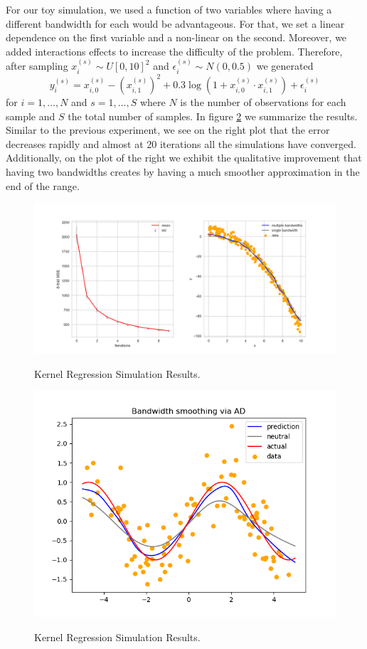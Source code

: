 \documentclass{article}
\begin{document}
For our toy simulation, we used a function of two variables where having a different
bandwidth for each would be advantageous. For that, we set a linear dependence on the first
variable and a non-linear on the second. Moreover, we added interactions effects to increase
the difficulty of the problem. Therefore, after sampling $x_i^{(s)} \sim U[0, 10]^2$ and
$\epsilon_i^{(s)} \sim N(0,0.5)$ we generated
$$
y_i^{(s)} =
x_{i,0}^{(s)} - \left( x_{i,1}^{(s)} \right)^{2} + 0.3 \log \left(1 + x_{i,0}^{(s)} \cdot
x_{i,1}^{(s)} \right) + \epsilon_i^{(s)}
$$
for $i=1, \dots, N$ and $s=1, \dots, S$ where $N$ is the number of observations for each
sample and $S$ the total number of samples. In figure \ref{krr} we summarize the results.
Similar to the previous experiment, we see on the right plot that the error decreases
rapidly and almost at 20 iterations all the simulations have converged. Additionally, on the
plot of the right we exhibit the qualitative improvement that having two bandwidths creates
by having a much smoother approximation in the end of the range.

\begin{figure}
  \centering
  \caption{Kernel Regression Simulation Results.}
  \includegraphics[width=\textwidth]{./pics/ker_reg_results.png}
  \label{krr}
\end{figure}

\begin{figure}
  \centering
  \caption{Kernel Regression Simulation Results.}
  \includegraphics[width=\textwidth]{./pics/example01.png}
  \label{krr}
\end{figure}
\end{document}
